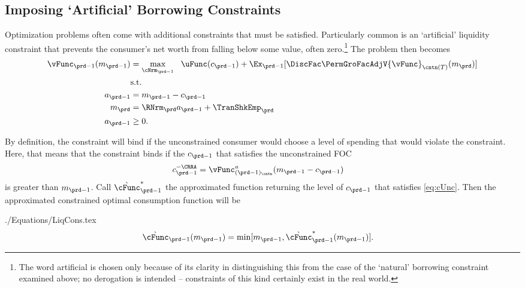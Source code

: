 \documentclass[\econtexRoot/SolvingMicroDSOPs]{subfiles}
\begin{document}
\subsection{Imposing `Artificial' Borrowing Constraints}

Optimization problems often come with additional constraints that must
be satisfied.  Particularly common is an `artificial' liquidity constraint that
prevents the consumer's net worth from falling below some value, often
zero.\footnote{The word artificial is chosen only because of its clarity in distinguishing
  this from the case of the `natural' borrowing constraint examined above; no derogation is
  intended -- constraints of this kind certainly exist in the real world.}  The problem then becomes
\begin{equation*}\begin{gathered}\begin{aligned}
      {\vFunc}_{\prd-1}({m}_{\prd-1})  & = \max_{\cNrm_{\prd-1}} ~~ \uFunc({c}_{\prd-1}) + \Ex_{\prd-1} [\DiscFac \PermGroFacAdjV{\vFunc}_{\cntn(T)}({m}_{\prd})] \label{eq:ConstrArt}
      \\ & \mbox{s.t.}  \nonumber
      \\ {a}_{\prd-1}  & = {m}_{\prd-1} - {c}_{\prd-1}
      \\ {m}_{\prd}  & = \RNrm_{\prd} {a}_{\prd-1} + \TranShkEmp_{\prd}
      \\ {a}_{\prd-1} & \geq 0 .
    \end{aligned}\end{gathered}\end{equation*}


By definition, the constraint will bind if the unconstrained consumer
would choose a level of spending that would violate the constraint.
Here, that means that the constraint binds if the ${c}_{\prd-1}$
that satisfies the unconstrained FOC
\begin{equation}\begin{gathered}\begin{aligned}
      {c}_{\prd-1}^{-\CRRA}  & = \vFunc^{{a}}_{({\prd-1})_\cntn}({m}_{\prd-1}-{c}_{\prd-1}) \label{eq:cUnc}
    \end{aligned}\end{gathered}\end{equation}
is greater than ${m}_{\prd-1}$.  Call $\grave{\cFunc}^{\ast}_{\prd-1}$ the approximated function
returning the level of ${c}_{\prd-1}$ that satisfies \eqref{eq:cUnc}.
Then the approximated constrained optimal consumption function will be
\begin{verbatimwrite}{./Equations/LiqCons.tex}
  \begin{equation}\begin{gathered}\begin{aligned}
        \grave{\cFunc}_{\prd-1}({m}_{\prd-1})  & = \min[{m}_{\prd-1},\grave{\cFunc}^{\ast}_{\prd-1}({m}_{\prd-1})] \label{eq:LiqCons}.
      \end{aligned}\end{gathered}\end{equation}
\end{verbatimwrite}
\unskip
\end{document}
